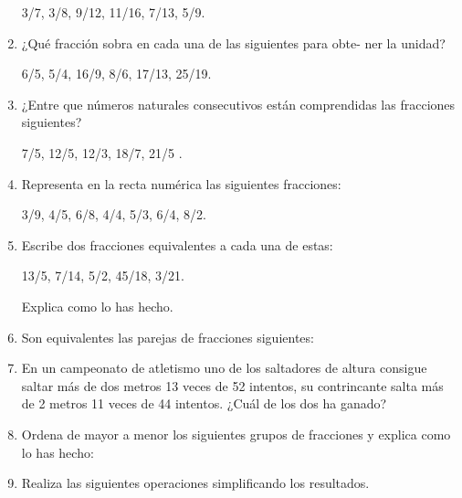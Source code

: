 \documentclass[10pt,twoside]{article}
\begin{document}
\begin{enumerate}
3/7, 3/8, 9/12, 11/16, 7/13, 5/9.
\item ¿Qué fracción sobra en cada una de las siguientes para obte-
ner la unidad?

6/5, 5/4, 16/9, 8/6, 17/13, 25/19.
\item ¿Entre que números naturales consecutivos están comprendidas las fracciones siguientes? 

7/5, 12/5, 12/3, 18/7, 21/5 .
\item Representa en la recta numérica las siguientes fracciones:

3/9, 4/5, 6/8, 4/4, 5/3, 6/4, 8/2.
\item Escribe dos fracciones equivalentes a cada una de estas:

13/5, 7/14, 5/2, 45/18, 3/21.

Explica como lo has hecho.
\item  Son equivalentes las parejas de fracciones siguientes:
\begin{enumerate}
\end{enumerate}
\item  En un campeonato de atletismo uno de los saltadores de altura consigue saltar más de dos metros 13 veces de 52 intentos, su contrincante salta más de 2 metros 11 veces de 44 intentos. ¿Cuál de los dos ha ganado?
\item  Ordena de mayor a menor los siguientes grupos de fracciones y explica como lo has hecho:
\begin{enumerate}
\end{enumerate}
\item Realiza las siguientes operaciones simplificando los resultados.

\end{enumerate}
\end{document}
